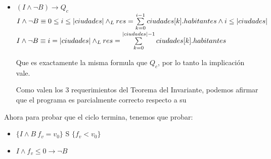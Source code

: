 \documentclass[10pt,a4paper]{article}
\begin{document}
\begin {enumerate}
\begin{itemize}
         $ \equiv def (res + ciudades[i].habitantes) \yLuego wp(i := i +1, I)_{res + ciudades[i].habitantes}^{res}$

         $ \equiv ((def(res) \land def(ciudades[i].habitantes) \land def(i)) \yLuego 0 \leq i < |ciudades|) \yLuego wp(i := i +1, I)_{res + ciudades[i].habitantes}^{res}$ \\

        $ \equiv (0 \leq i < |ciudades| \yLuego (o \leq i + 1 \leq |ciudades| \land res + ciudades[i].habitantes = \sum\limits_{j=0}^{i}{ciudades[j].habitantes}))$

        $ \equiv 0 \leq i < |ciudades| \land res = \sum\limits_{j=0}^{i - 1}{ciudades[j].habitantes} \\\text{(A la sumatoria le sacamos restamos el ultimo termino)}$ 

        Al final: 

        $ wp(S, I) \equiv \{ o \leq i < |ciudades| \land res = \sum\limits_{j=0}^{i - 1}{ciudades[j].habitantes}\}$

        que es exactamente igual a \{ $I \land B$\}. Por lo tanto podemos afirmar que $\{I \land B\} \rightarrow$ wp(S,I)
    y que vale la tripla de Hoare
        
        \item
            $ (I \land \neg B) \to Q_{c}$    \\
            $ I \land \neg B \equiv 0 \leq i \leq |ciudades| \land _L res = \sum\limits_{k=0}^{i - 1}{ciudades[k].habitantes} \land i \leq |ciudades| $ \\
            $ I \land \neg B \equiv i = |ciudades| \land _L res = \sum\limits_{k=0}^{|ciudades| - 1}{ciudades[k].habitantes}$

            Que es exactamente la misma formula que $Q_{c}$, por lo tanto la implicación vale.

            Como valen los 3 requerimientos del Teorema del Invariante, podemos afirmar que el programa es 
            parcialmente correcto respecto a su

    
        \end{itemize}
    Ahora para probar que el ciclo termina, tenemos que probar:

    \begin{itemize}
        \item $\{ I \land B \ f_{v} = v_{0}  \}$ S $\{f_{v} < v_{0}\}$  
        \item $ I \land f_{v} \leq 0 \to \neg B$
    \end{itemize}


\end{enumerate}
\end{document}
